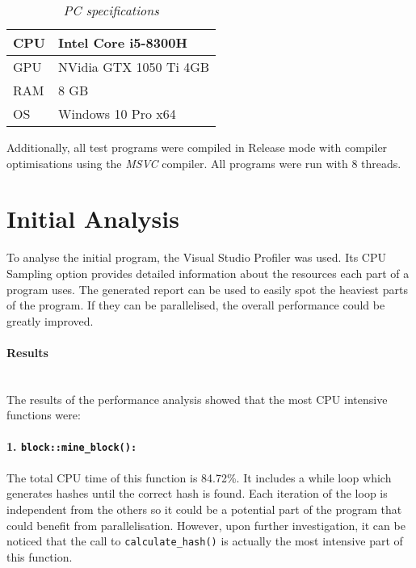 \documentclass[12pt, a4paper]{article}
\newcommand{\myparagraph}[1]{\paragraph{#1}\mbox{}\\} %
\begin{document}
    \begin{table}[!h]
        \centering
        \caption{\small{\textit{PC specifications}}}
        \label{table:specs}
        \begin{tabular}{|l|l|} 
        \hline
        {\cellcolor[rgb]{0.502,0.502,0.502}}CPU & {\cellcolor[rgb]{0.753,0.753,0.753}}Intel Core i5-8300H     \\ 
        \hline
        {\cellcolor[rgb]{0.502,0.502,0.502}}GPU & {\cellcolor[rgb]{0.753,0.753,0.753}}NVidia GTX 1050 Ti 4GB  \\ 
        \hline
        {\cellcolor[rgb]{0.502,0.502,0.502}}RAM & {\cellcolor[rgb]{0.753,0.753,0.753}}8 GB                    \\ 
        \hline
        {\cellcolor[rgb]{0.502,0.502,0.502}}OS  & {\cellcolor[rgb]{0.753,0.753,0.753}}Windows 10 Pro x64      \\
        \hline
        \end{tabular}
    \end{table}

    Additionally, all test programs were compiled in Release mode with compiler optimisations using the \textit{MSVC} compiler. All programs were run with 8 threads.

    \section{Initial Analysis}
    To analyse the initial program, the Visual Studio Profiler was used. Its CPU Sampling option provides detailed information about the resources each part of a program uses. The generated report can be used to easily spot the heaviest parts of the program. If they can be parallelised, the overall performance could be greatly improved.

    \myparagraph{Results}
    The results of the performance analysis showed that the most CPU intensive functions were:
    
    \paragraph{1. \texttt{block::mine\_block():}} The total CPU time of this function is 84.72\%. It includes a while loop which generates hashes until the correct hash is found. Each iteration of the loop is independent from the others so it could be a potential part of the program that could benefit from parallelisation. However, upon further investigation, it can be noticed that the call to \texttt{calculate\_hash()} is actually the most intensive part of this function.
\end{document}
